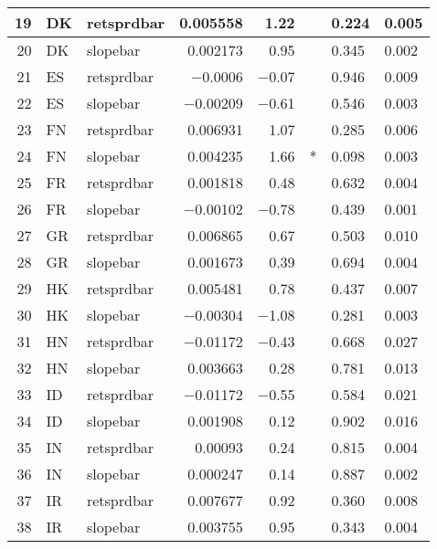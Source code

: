 \begin{longtable}{|r|l|l|r|r|l|l|l|}
   19 &    DK &    retsprdbar &    0.005558 &    1.22 &      &    0.224 &    0.005\\\hline
   20 &    DK &    slopebar &    0.002173 &    0.95 &      &    0.345 &    0.002\\\hline
   21 &    ES &    retsprdbar &    $-$0.0006 &    $-$0.07 &      &    0.946 &    0.009\\\hline
   22 &    ES &    slopebar &    $-$0.00209 &    $-$0.61 &      &    0.546 &    0.003\\\hline
   23 &    FN &    retsprdbar &    0.006931 &    1.07 &      &    0.285 &    0.006\\\hline
   24 &    FN &    slopebar &    0.004235 &    1.66 &    * &    0.098 &    0.003\\\hline
   25 &    FR &    retsprdbar &    0.001818 &    0.48 &      &    0.632 &    0.004\\\hline
   26 &    FR &    slopebar &    $-$0.00102 &    $-$0.78 &      &    0.439 &    0.001\\\hline
   27 &    GR &    retsprdbar &    0.006865 &    0.67 &      &    0.503 &    0.010\\\hline
   28 &    GR &    slopebar &    0.001673 &    0.39 &      &    0.694 &    0.004\\\hline
   29 &    HK &    retsprdbar &    0.005481 &    0.78 &      &    0.437 &    0.007\\\hline
   30 &    HK &    slopebar &    $-$0.00304 &    $-$1.08 &      &    0.281 &    0.003\\\hline
   31 &    HN &    retsprdbar &    $-$0.01172 &    $-$0.43 &      &    0.668 &    0.027\\\hline
   32 &    HN &    slopebar &    0.003663 &    0.28 &      &    0.781 &    0.013\\\hline
   33 &    ID &    retsprdbar &    $-$0.01172 &    $-$0.55 &      &    0.584 &    0.021\\\hline
   34 &    ID &    slopebar &    0.001908 &    0.12 &      &    0.902 &    0.016\\\hline
   35 &    IN &    retsprdbar &    0.00093 &    0.24 &      &    0.815 &    0.004\\\hline
   36 &    IN &    slopebar &    0.000247 &    0.14 &      &    0.887 &    0.002\\\hline
   37 &    IR &    retsprdbar &    0.007677 &    0.92 &      &    0.360 &    0.008\\\hline
   38 &    IR &    slopebar &    0.003755 &    0.95 &      &    0.343 &    0.004\\\hline

\end{longtable}
